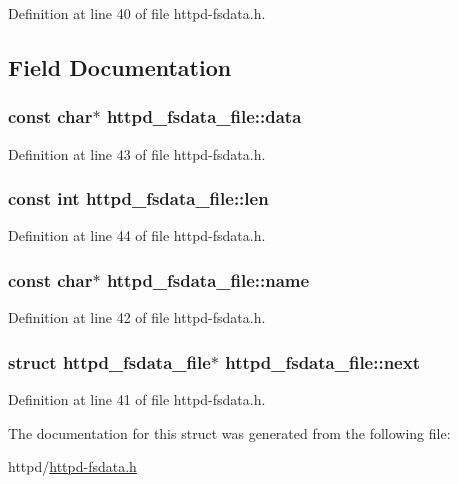 Definition at line 40 of file httpd-\/fsdata.h.



\subsection{Field Documentation}
\hypertarget{structhttpd__fsdata__file_ad467af3dd982835f28549340baf45cbe}{
\subsubsection[{data}]{\setlength{\rightskip}{0pt plus 5cm}const char$\ast$ {\bf httpd\_\-fsdata\_\-file::data}}}
\label{structhttpd__fsdata__file_ad467af3dd982835f28549340baf45cbe}


Definition at line 43 of file httpd-\/fsdata.h.

\hypertarget{structhttpd__fsdata__file_a6b6ff8657c9131e01ed0afb7024c7932}{
\subsubsection[{len}]{\setlength{\rightskip}{0pt plus 5cm}const int {\bf httpd\_\-fsdata\_\-file::len}}}
\label{structhttpd__fsdata__file_a6b6ff8657c9131e01ed0afb7024c7932}


Definition at line 44 of file httpd-\/fsdata.h.

\hypertarget{structhttpd__fsdata__file_a2bd77050e4f4c6b7545fa810f33ed288}{
\subsubsection[{name}]{\setlength{\rightskip}{0pt plus 5cm}const char$\ast$ {\bf httpd\_\-fsdata\_\-file::name}}}
\label{structhttpd__fsdata__file_a2bd77050e4f4c6b7545fa810f33ed288}


Definition at line 42 of file httpd-\/fsdata.h.

\hypertarget{structhttpd__fsdata__file_aaf8a286e2347fb88a421dc37e0382bf6}{
\subsubsection[{next}]{\setlength{\rightskip}{0pt plus 5cm}struct {\bf httpd\_\-fsdata\_\-file}$\ast$ {\bf httpd\_\-fsdata\_\-file::next}}}
\label{structhttpd__fsdata__file_aaf8a286e2347fb88a421dc37e0382bf6}


Definition at line 41 of file httpd-\/fsdata.h.



The documentation for this struct was generated from the following file:\begin{DoxyCompactItemize}
\item 
httpd/\hyperlink{httpd-fsdata_8h}{httpd-\/fsdata.h}\end{DoxyCompactItemize}

